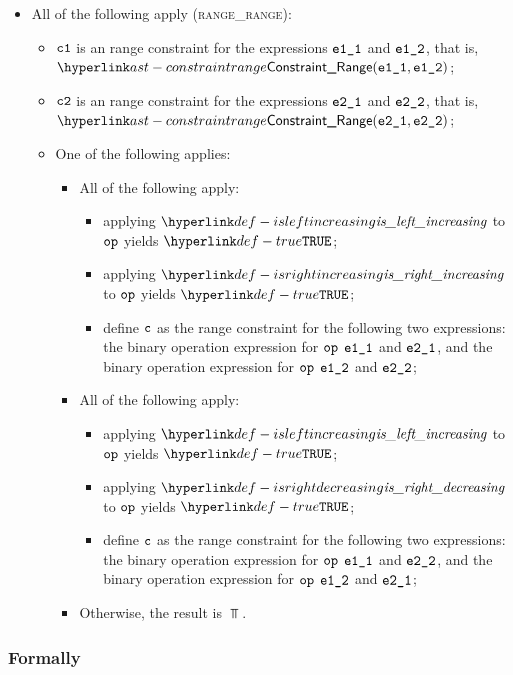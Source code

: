 \begin{itemize}
  \item All of the following apply (\textsc{range\_range}):
  \begin{itemize}
    \item $\vcone$ is an range constraint for the expressions $\veoneone$ and $\veonetwo$, that is, \\ $\ConstraintRange(\veoneone, \veonetwo)$;
    \item $\vctwo$ is an range constraint for the expressions $\vetwoone$ and $\vetwotwo$, that is, \\ $\ConstraintRange(\vetwoone, \vetwotwo)$;
    \item One of the following applies:
    \begin{itemize}
      \item All of the following apply:
      \begin{itemize}
        \item applying $\isleftincreasing$ to $\op$ yields $\True$;
        \item applying $\isrightincreasing$ to $\op$ yields $\True$;
        \item define $\vc$ as the range constraint for the following two expressions:
              the binary operation expression for $\op$ $\veoneone$ and $\vetwoone$, and
              the binary operation expression for $\op$ $\veonetwo$ and $\vetwotwo$;
      \end{itemize}
      \item All of the following apply:
      \begin{itemize}
        \item applying $\isleftincreasing$ to $\op$ yields $\True$;
        \item applying $\isrightdecreasing$ to $\op$ yields $\True$;
        \item define $\vc$ as the range constraint for the following two expressions:
              the binary operation expression for $\op$ $\veoneone$ and $\vetwotwo$, and
              the binary operation expression for $\op$ $\veonetwo$ and $\vetwoone$;
      \end{itemize}
      \item Otherwise, the result is $\Top$.
    \end{itemize}
  \end{itemize}
\end{itemize}

\subsubsection{Formally}
\begin{mathpar}
\end{mathpar}

